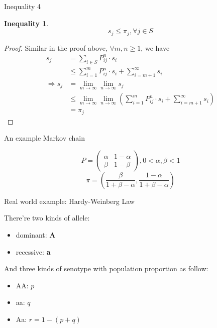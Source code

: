 \documentclass{beamer}
\newtheorem{ineq}{Inequality}
\begin{document}
\begin{frame}{Inequality 4}
	\begin{ineq}
		\[
		s_j \leq \pi_j, \forall j \in S
		\]
	\end{ineq}
\end{frame}

\begin{frame}
	\begin{proof}
		Similar in the proof above, $\forall m,n \geq 1$, we have
		\begin{align*}
			            s_j &= \sum_{i \in S} P^n_{ij} \cdot s_i \\
			                &\leq \sum_{i=1}^m P^n_{ij} \cdot s_i + \sum_{i=m+1}^\infty s_i \\
			\Rightarrow s_j &= \lim_{m \to \infty}\lim_{n \to \infty} s_j \\
			                &\leq \lim_{m \to \infty}\lim_{n \to \infty} \left( 
			                	\sum_{i=1}^m P^n_{ij} \cdot s_i + \sum_{i=m+1}^\infty s_i \right) \\
			                &= \pi_j
		\end{align*}
	\end{proof}
\end{frame}

\begin{frame}{An example Markov chain}
	\begin{example}
		\[
		P = 
		\begin{pmatrix}
			\alpha & 1 - \alpha \\
			\beta  & 1 - \beta
		\end{pmatrix},
		0 < \alpha, \beta < 1
		\]
		\[
		\pi = \left( \frac{\beta}{1+\beta-\alpha}, \frac{1-\alpha}{1+\beta-\alpha} \right) 
		\]
	\end{example}
\end{frame}

\begin{frame}{Real world example: Hardy-Weinberg Law}
	\begin{example}
		There're two kinds of allele: 
		\begin{itemize}
			\item dominant: \textbf{A}
			\item recessive: \textbf{a}
		\end{itemize}
		And three kinds of senotype with population proportion as follow:
		\begin{itemize}
			\item AA: $p$
			\item aa: $q$
			\item Aa: $r = 1 - (p + q)$
		\end{itemize}
	\end{example}
\end{frame}
\end{document}
